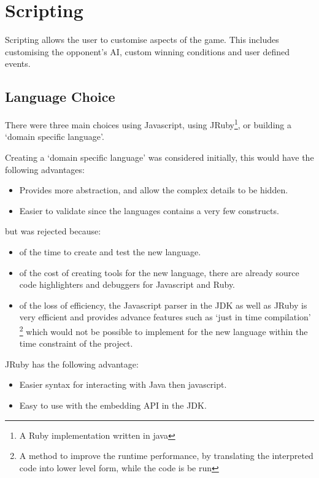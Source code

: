 \section{Scripting}
\label{sec:Scripting}

Scripting allows the user to customise aspects of the game. This includes customising the opponent's AI, custom winning conditions and user defined events. 

\subsection{Language Choice}

There were three main choices using Javascript, using JRuby\footnote{A Ruby implementation written in java}, or building a `domain specific language'.

Creating a `domain specific language' was considered initially, this would have the following advantages:
\begin{itemize}
	\item Provides more abstraction, and allow the complex details to be hidden.
	\item Easier to validate since the languages contains a very few constructs.  
\end{itemize}

\noindent but was rejected because:

\begin{itemize}
	\item of the time to create and test the new language.
	\item of the cost of creating tools for the new language, there are already source code highlighters and debuggers for Javascript and Ruby.
	\item of the loss of efficiency, the Javascript parser in the JDK as well as JRuby is very efficient and provides advance features such as `just in time compilation' 
	\footnote{A method to improve the runtime performance, by translating the interpreted code into lower level form, while the code is be run
	}  
which would not be possible to implement for the new language within the time constraint of the project.
\end{itemize}

\noindent JRuby has the following advantage:
\begin{itemize}
	\item Easier syntax for interacting with Java then javascript.
	\item Easy to use with the embedding API in the JDK.
\end{itemize}

